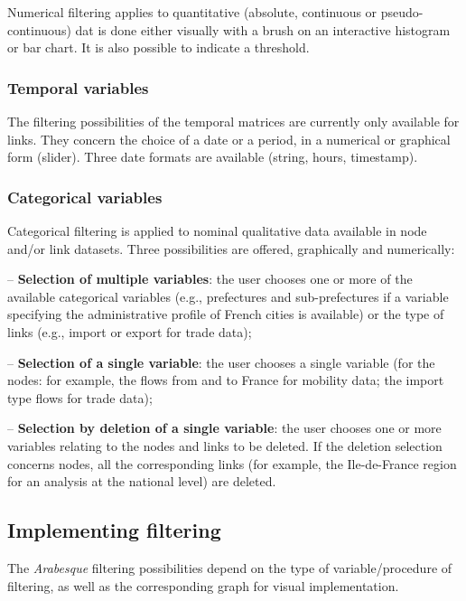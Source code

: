 \documentclass[
  letterpaper,
  DIV=11,
  numbers=noendperiod]{scrreprt}
\begin{document}
Numerical filtering applies to quantitative (absolute, continuous or
pseudo-continuous) dat is done either visually with a brush on an
interactive histogram or bar chart. It is also possible to indicate a
threshold.

\subsubsection{Temporal variables}\label{temporal-variables}

The filtering possibilities of the temporal matrices are currently only
available for links. They concern the choice of a date or a period, in a
numerical or graphical form (slider). Three date formats are available
(string, hours, timestamp).

\subsubsection{Categorical variables}\label{categorical-variables}

Categorical filtering is applied to nominal qualitative data available
in node and/or link datasets. Three possibilities are offered,
graphically and numerically:

-- \textbf{Selection of multiple variables}: the user chooses one or
more of the available categorical variables (e.g., prefectures and
sub-prefectures if a variable specifying the administrative profile of
French cities is available) or the type of links (e.g., import or export
for trade data);

-- \textbf{Selection of a single variable}: the user chooses a single
variable (for the nodes: for example, the flows from and to France for
mobility data; the import type flows for trade data);

-- \textbf{Selection by deletion of a single variable}: the user chooses
one or more variables relating to the nodes and links to be deleted. If
the deletion selection concerns nodes, all the corresponding links (for
example, the Ile-de-France region for an analysis at the national level)
are deleted.

\subsection{Implementing filtering}\label{implementing-filtering}

The \emph{Arabesque} filtering possibilities depend on the type of
variable/procedure of filtering, as well as the corresponding graph for
visual implementation.
\end{document}
